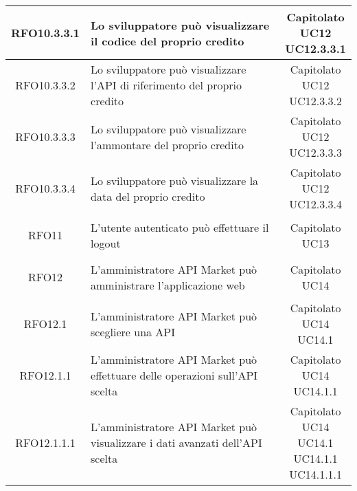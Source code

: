 \begin{longtable}{|c|p{8cm}|c|}
\hypertarget{RFO10.3.3.1}{RFO10.3.3.1} & Lo sviluppatore può visualizzare il codice del proprio credito & \makecell*{Capitolato\\UC12\\UC12.3.3.1} \\
\hline
\hypertarget{RFO10.3.3.2}{RFO10.3.3.2} & Lo sviluppatore può visualizzare l'API di riferimento del proprio credito & \makecell*{Capitolato\\UC12\\UC12.3.3.2} \\
\hline
\hypertarget{RFO10.3.3.3}{RFO10.3.3.3} & Lo sviluppatore può visualizzare l'ammontare del proprio credito & \makecell*{Capitolato\\UC12\\UC12.3.3.3} \\
\hline
\hypertarget{RFO10.3.3.4}{RFO10.3.3.4} & Lo sviluppatore può visualizzare la data del proprio credito & \makecell*{Capitolato\\UC12\\UC12.3.3.4} \\
\hline

\hypertarget{RFO11}{RFO11} & L'utente autenticato può effettuare il logout & \makecell*{Capitolato\\UC13} \\
\hline

\hypertarget{RFO12}{RFO12} & L'amministratore API Market può amministrare l'applicazione web & \makecell*{Capitolato\\UC14} \\
\hline

\hypertarget{RFO12.1}{RFO12.1} & L'amministratore API Market può scegliere una API & \makecell*{Capitolato\\UC14\\UC14.1} \\
\hline

\hypertarget{RFO12.1.1}{RFO12.1.1} & L'amministratore API Market può effettuare delle operazioni sull'API scelta & \makecell*{Capitolato\\UC14\\UC14.1.1} \\
\hline

\hypertarget{RFO12.1.1.1}{RFO12.1.1.1} & L'amministratore API Market può visualizzare i dati avanzati dell'API scelta & \makecell*{Capitolato\\UC14\\UC14.1\\UC14.1.1\\UC14.1.1.1} \\
\hline


\end{longtable}

